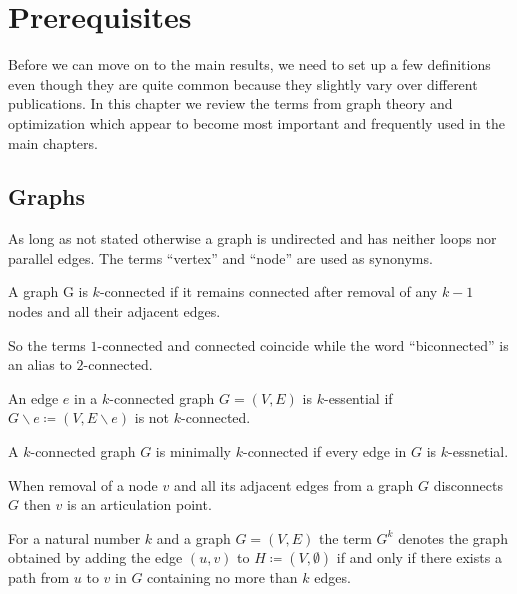\chapter{Prerequisites}
Before we can move on to the main results, we need to set up a few definitions even though they are quite common because they slightly vary over different publications. In this chapter we review the terms from graph theory and optimization which appear to become most important and frequently used in the main chapters.

\section{Graphs}
As long as not stated otherwise a graph is undirected and has neither loops nor parallel edges. The terms \enquote{vertex} and \enquote{node} are used as synonyms.

\begin{definition} [\(k\)-connected]\label{def:k_connected}
  A graph G is \(k\)-connected if it remains connected after removal of any \(k-1\) nodes and all their adjacent edges.
\end{definition}

So the terms \(1\)-connected and connected coincide while the word \enquote{biconnected} is an alias to \(2\)-connected.

\begin{definition} [\(k\)-essential]\label{def:k_essential}
  An edge \(e\) in a \(k\)-connected graph \(G = (V, E)\) is \(k\)-essential if \(G \backslash e \coloneqq (V, E \backslash e)\) is not \(k\)-connected.
\end{definition}

\begin{definition}\label{def:min_k_connected}
  A \(k\)-connected graph \(G\) is minimally \(k\)-connected if every edge in \(G\) is \(k\)-essnetial.
\end{definition}

\begin{definition}\label{def:articulation_point}
  When removal of a node \(v\) and all its adjacent edges from a graph \(G\) disconnects \(G\) then \(v\) is an articulation point.
\end{definition}

\begin{definition}\label{def:power_of_graph}
  For a natural number \(k\) and a graph \(G = (V, E)\) the term \(G^{k}\) denotes the graph obtained by adding the edge \((u,v)\) to \(H \coloneqq (V, \emptyset)\) if and only if there exists a path from \(u\) to \(v\) in \(G\) containing no more than \(k\) edges.
\end{definition}

